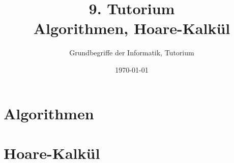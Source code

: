 



\usepackage{tcolorbox}

\newcommand{\HTB}[1]{\ensuremath{\colorbox{lightgray!90}{\{ #1 \}}}}
\newcommand{\HT}[3]{\ensuremath{\HTB{#1} \; #2 \; \HTB{#3}}}


\title[Algorithmen, Hoare-Kalkül]{9. Tutorium\\ Algorithmen, Hoare-Kalkül}
\subtitle{Grundbegriffe der Informatik, Tutorium \hashtag\mytutnumber}
\date{\today}


\titleframe
\roadmap


\section{Algorithmen}


\section{Hoare-Kalkül}


%


\section{}
\questionframe
\lastframe
{}
